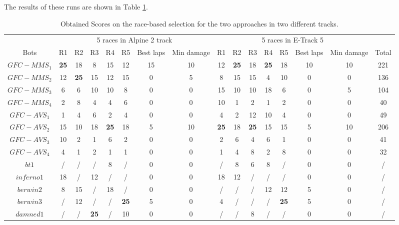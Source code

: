 \documentclass[conference]{IEEEtran}
\begin{document}
The results of these runs are shown in Table \ref{tab:runsresults}.
\begin{table}[ht]
  \centering
  {\scriptsize %
    \caption{ Obtained Scores on the race-based selection for the two approaches in two different tracks. }
		{
			\begin{tabular}{|c||c|c|c|c|c|c|c||c|c|c|c|c|c|c||c|}
				\hline
				&\multicolumn{7}{c||}{5 races in Alpine 2 track}&\multicolumn{7}{c|}{5 races in E-Track 5}&\\
				\cline{2-16}
Bots	& 		  R1 & 		  R2 & 		 R3 & 		  R4& 		   R5&Best laps&Min damage& R1&R2&R3&R4&R5&Best laps&Min damage&Total\\
				\hline		
$GFC-MMS_1$ &\textbf{25}& 18		 &8			&15			&12        &15 &10&		12&\textbf{25}& 		18&\textbf{25}&		18&10&10&221\\
$GFC-MMS_2$ &12		 &\textbf{25}& 15 		&12			&15			&0&5&8			&15		  &			15&	4	&10&0&0&136\\
$GFC-MMS_3$ &6			 &6			&10			&10			&8			&0&0&15			&10		  &			10&	18	&6&0&5&104\\
$GFC-MMS_4$ &2			 &	8		&4			&4			&      6    &0&0& 10		& 1		  &		 2&1		&2&0&0&40\\
$GFC-AVS_1$ &1			 &4			&6			&2			&	4		&0&0&4		    &2		  &			12&	10	& 4&0&0&49\\					
$GFC-AVS_2$ &15		&10			& 18		&\textbf{25}&18			&5&10&\textbf{25}& 18	  &	\textbf{25} &15&15&5&10&206\\
$GFC-AVS_3$ &10		&2			&1			&6			&	2		&0&0&2			&6		  &			4&	6	&1&0&0&41\\
$GFC-AVS_4$ &4			&1			&2			&1			&	1		&0&0&1			&4	      &		8&	2	&8&0&0&32\\	
$bt1$ 	 &/			&/			&/			&8			&/			&0&0&/			&8		  &			 6&8		&/&0&0&/\\
$inferno1$&18		&/			&12			&/			&/			&0&0&18			&12		  &			/&/		& /& 0&0&/\\			
$berwin2$&8			&15			&/			&18			&/			&0&0&/			&/		&			/&12	&12&5&0&/\\
$berwin3$&/			&12			&/			&/			&\textbf{25}&5&0&4			&/		&			/&/		&\textbf{25}&5&0&/\\
$damned1$&/			&/			&\textbf{25}&/			&10			&0&0&/			&/		& 			8&/		& /&0&0&/\\			
				\hline
				\hline
			
			\end{tabular}
		}\label{tab:runsresults}
	}
\end{table}
\end{document}
